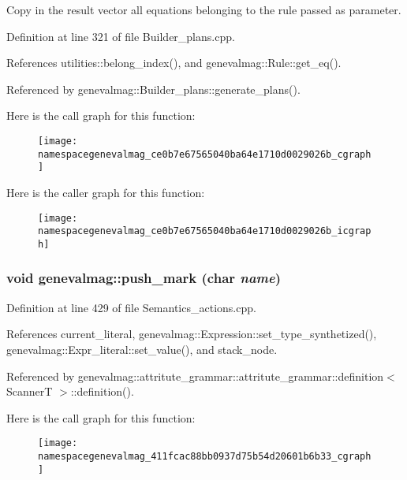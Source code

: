 Copy in the result vector all equations belonging to the rule passed as parameter. 

Definition at line 321 of file Builder\_\-plans.cpp.

References utilities::belong\_\-index(), and genevalmag::Rule::get\_\-eq().

Referenced by genevalmag::Builder\_\-plans::generate\_\-plans().

Here is the call graph for this function:\nopagebreak
\begin{figure}[H]
\begin{center}
\leavevmode
\texttt{[image: namespacegenevalmag\_ce0b7e67565040ba64e1710d0029026b\_cgraph]}
\end{center}
\end{figure}


Here is the caller graph for this function:\nopagebreak
\begin{figure}[H]
\begin{center}
\leavevmode
\texttt{[image: namespacegenevalmag\_ce0b7e67565040ba64e1710d0029026b\_icgraph]}
\end{center}
\end{figure}
\hypertarget{namespacegenevalmag_411fcac88bb0937d75b54d20601b6b33}{
\subsubsection[{push\_\-mark}]{\setlength{\rightskip}{0pt plus 5cm}void genevalmag::push\_\-mark (char {\em name})}}
\label{namespacegenevalmag_411fcac88bb0937d75b54d20601b6b33}




Definition at line 429 of file Semantics\_\-actions.cpp.

References current\_\-literal, genevalmag::Expression::set\_\-type\_\-synthetized(), genevalmag::Expr\_\-literal::set\_\-value(), and stack\_\-node.

Referenced by genevalmag::attritute\_\-grammar::attritute\_\-grammar::definition$<$ ScannerT $>$::definition().

Here is the call graph for this function:\nopagebreak
\begin{figure}[H]
\begin{center}
\leavevmode
\texttt{[image: namespacegenevalmag\_411fcac88bb0937d75b54d20601b6b33\_cgraph]}
\end{center}
\end{figure}


